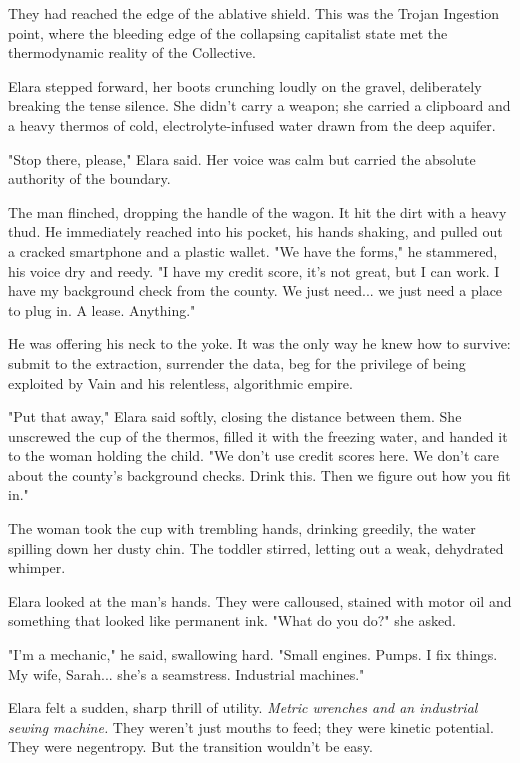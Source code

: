 They had reached the edge of the ablative shield. This was the Trojan Ingestion point, where the bleeding edge of the collapsing capitalist state met the thermodynamic reality of the Collective. 

Elara stepped forward, her boots crunching loudly on the gravel, deliberately breaking the tense silence. She didn't carry a weapon; she carried a clipboard and a heavy thermos of cold, electrolyte-infused water drawn from the deep aquifer. 

"Stop there, please," Elara said. Her voice was calm but carried the absolute authority of the boundary. 

The man flinched, dropping the handle of the wagon. It hit the dirt with a heavy thud. He immediately reached into his pocket, his hands shaking, and pulled out a cracked smartphone and a plastic wallet. "We have the forms," he stammered, his voice dry and reedy. "I have my credit score, it’s not great, but I can work. I have my background check from the county. We just need... we just need a place to plug in. A lease. Anything."

He was offering his neck to the yoke. It was the only way he knew how to survive: submit to the extraction, surrender the data, beg for the privilege of being exploited by Vain and his relentless, algorithmic empire.

"Put that away," Elara said softly, closing the distance between them. She unscrewed the cup of the thermos, filled it with the freezing water, and handed it to the woman holding the child. "We don't use credit scores here. We don't care about the county's background checks. Drink this. Then we figure out how you fit in."

The woman took the cup with trembling hands, drinking greedily, the water spilling down her dusty chin. The toddler stirred, letting out a weak, dehydrated whimper. 

Elara looked at the man's hands. They were calloused, stained with motor oil and something that looked like permanent ink. "What do you do?" she asked.

"I’m a mechanic," he said, swallowing hard. "Small engines. Pumps. I fix things. My wife, Sarah... she's a seamstress. Industrial machines."

Elara felt a sudden, sharp thrill of utility. \textit{Metric wrenches and an industrial sewing machine.} They weren't just mouths to feed; they were kinetic potential. They were negentropy. But the transition wouldn't be easy. 

